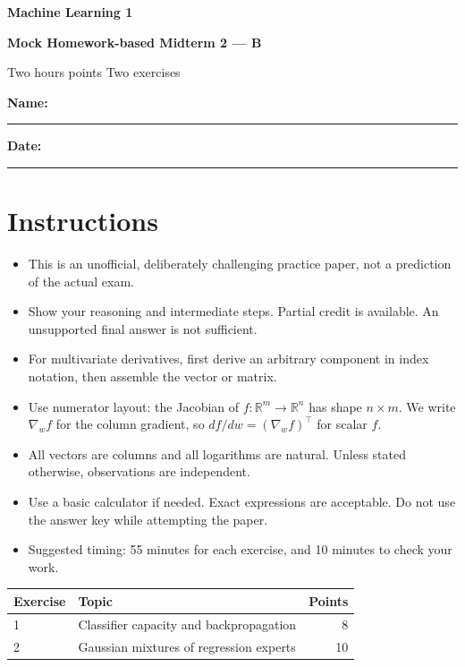 \documentclass[11pt,a4paper]{article}
\newcommand{\R}{\mathbb R}
\begin{document}
\begin{center}
  {\Huge\bfseries\color{examblue}Machine Learning 1}\par
  \vspace{0.4em}
  {\LARGE\bfseries Mock Homework-based Midterm 2 --- B}\par
  \vspace{1em}
  {\large Two hours  points \qquad Two exercises}
\end{center}
\vspace{1em}
\textbf{Name:} \rule{8cm}{0.4pt}\hfill\textbf{Date:} \rule{3cm}{0.4pt}

\section*{Instructions}
\begin{itemize}
  \item This is an unofficial, deliberately challenging practice paper, not a prediction of the actual exam.
  \item Show your reasoning and intermediate steps. Partial credit is available. An unsupported final answer is not sufficient.
  \item For multivariate derivatives, first derive an arbitrary component in index notation, then assemble the vector or matrix.
  \item Use numerator layout: the Jacobian of $f:\R^m\to\R^n$ has shape $n\times m$. We write $\nabla_w f$ for the column gradient, so $df/dw=(\nabla_w f)^\top$ for scalar $f$.
  \item All vectors are columns and all logarithms are natural. Unless stated otherwise, observations are independent.
  \item Use a basic calculator if needed. Exact expressions are acceptable. Do not use the answer key while attempting the paper.
  \item Suggested timing: 55 minutes for each exercise, and 10 minutes to check your work.
\end{itemize}

\begin{center}
\begin{tabular}{llr}
\toprule
Exercise & Topic & Points\\
\midrule
1 & Classifier capacity and backpropagation & 8\\
2 & Gaussian mixtures of regression experts & 10\\
\bottomrule
\end{tabular}
\end{center}
\end{document}
